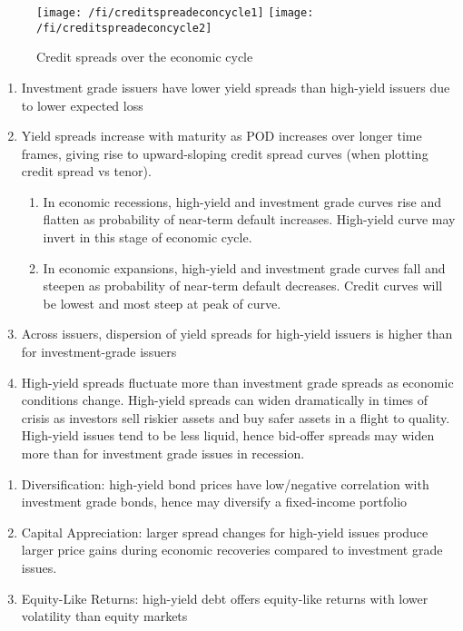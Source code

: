 \begin{figure}[H]
\centering
\texttt{[image: /fi/creditspreadeconcycle1]}
\texttt{[image: /fi/creditspreadeconcycle2]}
\caption{Credit spreads over the economic cycle}
\end{figure}

\begin{remark} 
\begin{enumerate}[label=\roman*.]
\setlength{\itemsep}{0pt}
\item Investment grade issuers have lower yield spreads than high-yield issuers due to lower expected loss
\item Yield spreads increase with maturity as POD increases over longer time frames, giving rise to upward-sloping credit spread curves (when plotting credit spread vs tenor).
\begin{enumerate}[label=\roman*.]
\setlength{\itemsep}{0pt}
\item In economic recessions, high-yield and investment grade curves rise and flatten as probability of near-term default increases. High-yield curve may invert in this stage of economic cycle.
\item In economic expansions, high-yield and investment grade curves fall and steepen as probability of near-term default decreases. Credit curves will be lowest and most steep at peak of curve.
\end{enumerate}
\item Across issuers, dispersion of yield spreads for high-yield issuers is higher than for investment-grade issuers
\item High-yield spreads fluctuate more than investment grade spreads as economic conditions change. High-yield spreads can widen dramatically in times of crisis as investors sell riskier assets and buy safer assets in a flight to quality. High-yield issues tend to be less liquid, hence bid-offer spreads may widen more than for investment grade issues in recession.
\end{enumerate}
\end{remark}

\begin{remark} 
\begin{enumerate}[label=\roman*.]
\setlength{\itemsep}{0pt}
\item Diversification: high-yield bond prices have low/negative correlation with investment grade bonds, hence may diversify a fixed-income portfolio
\item Capital Appreciation: larger spread changes for high-yield issues produce larger price gains during economic recoveries compared to investment grade issues.
\item Equity-Like Returns: high-yield debt offers equity-like returns with lower volatility than equity markets
\end{enumerate}
\end{remark}

